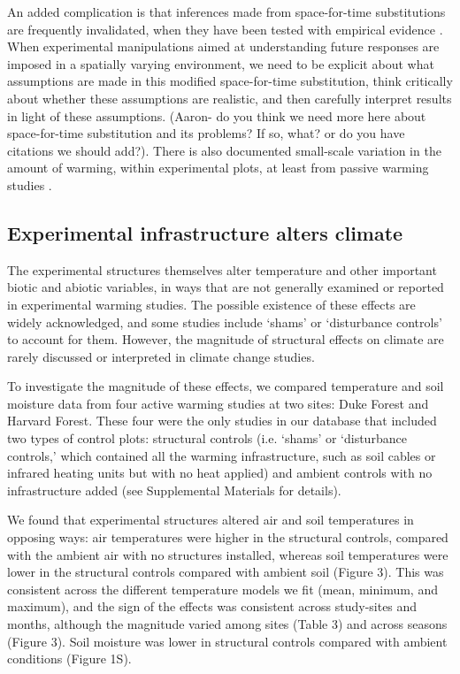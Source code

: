 \documentclass{article}
\begin{document}
\par An added complication is that inferences made from space-for-time substitutions are frequently invalidated, when they have been tested with empirical evidence \citep{johnson2008}. When experimental manipulations aimed at understanding future responses are imposed in a spatially varying environment, we need to be explicit about what assumptions are made in this modified space-for-time substitution, think critically about whether these assumptions are realistic, and then carefully interpret results in light of these assumptions. (Aaron- do you think we need more here about space-for-time substitution and its problems? If so, what? or do you have citations we should add?). There is also documented small-scale variation in the amount of warming, within experimental plots, at least from passive warming studies \citep {marion1997}.

\subsection* {Experimental infrastructure alters climate}
The experimental structures themselves alter temperature and other important biotic and abiotic variables, in ways that are not generally examined or reported in experimental warming studies. The possible existence of these effects are widely acknowledged, and some studies include `shams' or `disturbance controls' to account for them. However, the magnitude of structural effects on climate are rarely discussed or interpreted in climate change studies.

\par To investigate the magnitude of these effects, we compared temperature and soil moisture data from four active warming studies at two sites: Duke Forest and Harvard Forest\citep{farnsworth1995,clark2014a, marchin2015, pelini2011}. These four were the only studies in our database that included two types of control plots: structural controls (i.e. `shams' or `disturbance controls,' which contained all the warming infrastructure, such as soil cables or infrared heating units but with no heat applied) and ambient controls with no infrastructure added (see Supplemental Materials for details).  

\par We found that experimental structures altered air and soil temperatures in opposing ways:  air temperatures were higher in the structural controls, compared with the ambient air with no structures installed, whereas soil temperatures were lower in the structural controls compared with ambient soil (Figure 3). This was consistent across the different temperature models we fit (mean, minimum, and maximum), and the sign of the effects was consistent across study-sites and months, although the magnitude varied among sites (Table 3) and across seasons (Figure 3). Soil moisture was lower in structural controls compared with ambient conditions (Figure 1S). 
\end{document}

